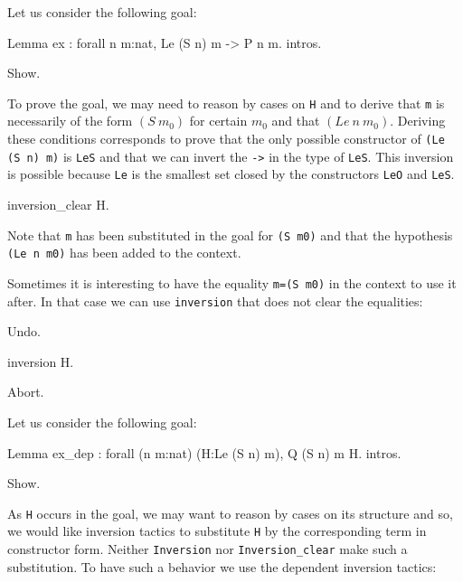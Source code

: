 \begin{coq_example*}
Let us consider the following goal:

\begin{coq_eval}
Lemma ex : forall n m:nat, Le (S n) m -> P n m.
intros.
\end{coq_eval}

\begin{coq_example}
Show.
\end{coq_example}

To prove the goal, we may need to reason by cases on \texttt{H} and to
derive that \texttt{m} is necessarily of
the form $(S~m_0)$ for certain $m_0$ and that $(Le~n~m_0)$.
Deriving these conditions corresponds to prove that the
only possible constructor of \texttt{(Le (S n) m)} is
\texttt{LeS} and that we can invert the
\texttt{->} in the type  of \texttt{LeS}.
This inversion is possible because \texttt{Le} is the smallest set closed by
the constructors \texttt{LeO} and \texttt{LeS}.

\begin{coq_example}
inversion_clear H.
\end{coq_example}

Note that \texttt{m} has been substituted in the goal for \texttt{(S m0)}
and that the hypothesis \texttt{(Le n m0)} has been added to the
context.

Sometimes it is
interesting to have the equality \texttt{m=(S m0)} in the
context to use it after. In that case we can use \texttt{inversion} that
does not clear the equalities:

\begin{coq_eval}
Undo.
\end{coq_eval}

\begin{coq_example}
inversion H.
\end{coq_example}

\begin{coq_eval}
Abort.
\end{coq_eval}


Let us consider the following goal:

\begin{coq_eval}
Lemma ex_dep : forall (n m:nat) (H:Le (S n) m), Q (S n) m H.
intros.
\end{coq_eval}

\begin{coq_example}
Show.
\end{coq_example}

As \texttt{H} occurs in the goal, we may want to reason by cases on its
structure and so, we would like  inversion tactics to
substitute \texttt{H} by the corresponding term in constructor form.
Neither \texttt{Inversion} nor  {\tt Inversion\_clear} make such a
substitution.
To have such a behavior we use the dependent inversion tactics:


\end{coq_example*}
